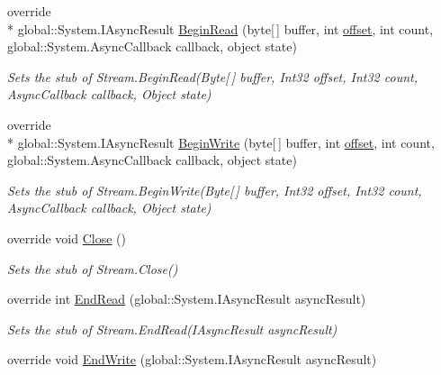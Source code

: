 \begin{DoxyCompactItemize}
override \\*
global\-::\-System.\-I\-Async\-Result \hyperlink{class_system_1_1_security_1_1_cryptography_1_1_fakes_1_1_stub_crypto_stream_a6ac482058ba2413f5dc9c1511c43fb3a}{Begin\-Read} (byte\mbox{[}$\,$\mbox{]} buffer, int \hyperlink{jquery-1_810_82_8js_a4a9f594d20d927164551fc7fa4751a2f}{offset}, int count, global\-::\-System.\-Async\-Callback callback, object state)
\begin{DoxyCompactList}\small\item\em Sets the stub of Stream.\-Begin\-Read(\-Byte\mbox{[}$\,$\mbox{]} buffer, Int32 offset, Int32 count, Async\-Callback callback, Object state)\end{DoxyCompactList}\item 
override \\*
global\-::\-System.\-I\-Async\-Result \hyperlink{class_system_1_1_security_1_1_cryptography_1_1_fakes_1_1_stub_crypto_stream_afdc7822360e6828103ae934aab812fc3}{Begin\-Write} (byte\mbox{[}$\,$\mbox{]} buffer, int \hyperlink{jquery-1_810_82_8js_a4a9f594d20d927164551fc7fa4751a2f}{offset}, int count, global\-::\-System.\-Async\-Callback callback, object state)
\begin{DoxyCompactList}\small\item\em Sets the stub of Stream.\-Begin\-Write(\-Byte\mbox{[}$\,$\mbox{]} buffer, Int32 offset, Int32 count, Async\-Callback callback, Object state)\end{DoxyCompactList}\item 
override void \hyperlink{class_system_1_1_security_1_1_cryptography_1_1_fakes_1_1_stub_crypto_stream_a6417cc87fd219c916cba647515a1f113}{Close} ()
\begin{DoxyCompactList}\small\item\em Sets the stub of Stream.\-Close()\end{DoxyCompactList}\item 
override int \hyperlink{class_system_1_1_security_1_1_cryptography_1_1_fakes_1_1_stub_crypto_stream_a8e5804f40a01b6cbfe99c41a222c97f2}{End\-Read} (global\-::\-System.\-I\-Async\-Result async\-Result)
\begin{DoxyCompactList}\small\item\em Sets the stub of Stream.\-End\-Read(\-I\-Async\-Result async\-Result)\end{DoxyCompactList}\item 
override void \hyperlink{class_system_1_1_security_1_1_cryptography_1_1_fakes_1_1_stub_crypto_stream_a0fdea2574906aafb4f212df867554043}{End\-Write} (global\-::\-System.\-I\-Async\-Result async\-Result)

\end{DoxyCompactItemize}
